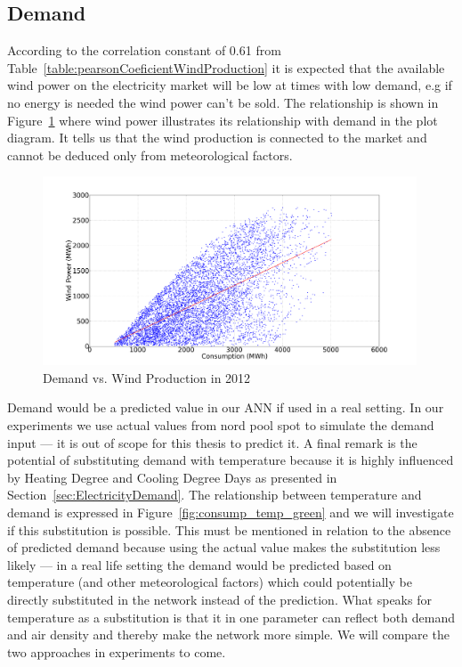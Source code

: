 \subsection{Demand}
\label{sec:demandWindProduction}
According to the correlation constant of 0.61 from Table~\ref{table:pearsonCoeficientWindProduction} it is expected that the available wind power on the electricity market will be low at times with low demand, e.g if no energy is needed the wind power can't be sold.  The relationship is shown in Figure~\ref{fig:demandVsWindProduction} where wind power illustrates its relationship with demand in the plot diagram. It tells us that the wind production is connected to the market and cannot be deduced only from meteorological factors.

\begin{figure}[H]
\centering
\includegraphics[width=0.99\textwidth]{billeder/consumptionVsWindProduction.png}
\caption{Demand vs. Wind Production in 2012}
\label{fig:demandVsWindProduction}
\end{figure}

\noindent Demand would be a predicted value in our ANN if used in a real setting. In our experiments we use actual values from nord pool spot to simulate the demand input --- it is out of scope for this thesis to predict it. A final remark is the potential of substituting demand with temperature because it is highly influenced by Heating Degree and Cooling Degree Days as presented in Section~\ref{sec:ElectricityDemand}. The relationship between temperature and demand is expressed in Figure~\ref{fig:consump_temp_green} and we will investigate if this substitution is possible. This must be mentioned in relation to the absence of predicted demand because using the actual value makes the substitution less likely --- in a real life setting the demand would be predicted based on temperature (and other meteorological factors) which could potentially be directly substituted in the network instead of the prediction. What speaks for temperature as a substitution is that it in one parameter can reflect both demand and air density and thereby make the network more simple. We will compare the two approaches in experiments to come. 

